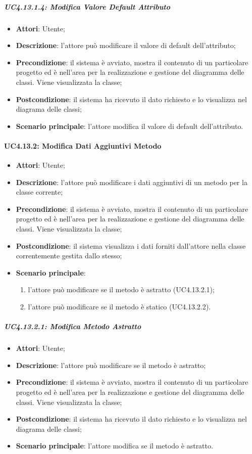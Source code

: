 \subparagraph{UC4.13.1.4: Modifica Valore Default Attributo}
\label{UC4.13.1.4}
\begin{itemize}
	\item \textbf{Attori}: Utente;
	\item \textbf{Descrizione}: l'attore può modificare il valore di default dell'attributo;
	\item \textbf{Precondizione}: il sistema è avviato, mostra il contenuto di un particolare progetto ed è nell'area per la realizzazione e gestione del diagramma delle classi. Viene visualizzata la classe;
	\item \textbf{Postcondizione}: il sistema ha ricevuto il dato richiesto e lo visualizza nel diagrama delle classi;
	\item \textbf{Scenario principale}: l'attore modifica  il valore di default dell'attributo.
\end{itemize}

\paragraph{UC4.13.2: Modifica Dati Aggiuntivi Metodo}
\label{UC4.13.2}
\begin{itemize}
	\item \textbf{Attori}: Utente;
	\item \textbf{Descrizione}: l'attore può modificare i dati aggiuntivi di un metodo per la classe corrente;
	\item \textbf{Precondizione}:  il sistema è avviato, mostra il contenuto di un particolare progetto ed è nell'area per la realizzazione e gestione del diagramma delle classi. Viene visualizzata la classe;
	\item \textbf{Postcondizione}: il sistema visualizza i dati forniti dall'attore nella classe correntemente gestita dallo stesso;
	\item \textbf{Scenario principale}:
	\begin{enumerate}
		\item l'attore può modificare se il metodo è astratto (UC4.13.2.1);
		\item l'attore può modificare se il metodo è statico (UC4.13.2.2).
	\end{enumerate}
\end{itemize}

\subparagraph{UC4.13.2.1: Modifica Metodo Astratto}
\label{UC4.13.2.1}
\begin{itemize}
	\item \textbf{Attori}: Utente;
	\item \textbf{Descrizione}: l'attore può modificare se il metodo è astratto;
	\item \textbf{Precondizione}: il sistema è avviato, mostra il contenuto di un particolare progetto ed è nell'area per la realizzazione e gestione del diagramma delle classi. Viene visualizzata la classe;
	\item \textbf{Postcondizione}: il sistema ha ricevuto il dato richiesto e lo visualizza nel diagrama delle classi;
	\item \textbf{Scenario principale}: l'attore modifica se il metodo è astratto.
\end{itemize}

